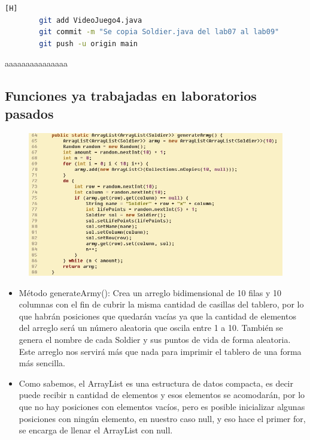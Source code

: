 \documentclass{article}
\begin{document}
	\begin{lstlisting}[language=bash,caption={Commit: de2a4e5f1787deaab8683e2f4ca01a0d3922cd9e }][H]
		git add VideoJuego4.java
		git commit -m "Se copia Soldier.java del lab07 al lab09"
		git push -u origin main
	\end{lstlisting}
	
aaaaaaaaaaaaaaa
	
	\subsection{Funciones ya trabajadas en laboratorios pasados}

	\begin{figure}[H]
		\centering
		\includegraphics[width=1\textwidth,keepaspectratio]{img/generateArmy.jpg}
	\end{figure}
	
	\begin{itemize}	
		
		\item Método generateArmy(): Crea un arreglo bidimensional de 10 filas y 10 columnas con
		el fin de cubrir la misma cantidad de casillas del tablero, por
		lo que habrán posiciones que quedarán vacías ya que la cantidad de elementos del arreglo será un número aleatoria que oscila entre 1 a 10. También se genera el nombre de cada Soldier y
		sus puntos de vida de forma aleatoria. Este arreglo nos servirá más que nada para imprimir el
		tablero de una forma más sencilla.
		\item Como sabemos, el ArrayList es una estructura de datos compacta, es decir puede recibir n cantidad de elementos y esos elementos se acomodarán, por lo que no hay posiciones con elementos vacíos, pero es posible inicializar algunas posiciones con ningún elemento, en nuestro caso null, y eso hace el primer for, se encarga de llenar el ArrayList con null.
	\end{itemize}
	
\end{document}

